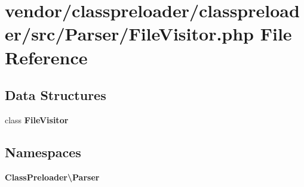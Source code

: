 \section{vendor/classpreloader/classpreloader/src/\+Parser/\+File\+Visitor.php File Reference}
\label{_file_visitor_8php}
\subsection*{Data Structures}
\begin{DoxyCompactItemize}
\item 
class {\bf File\+Visitor}
\end{DoxyCompactItemize}
\subsection*{Namespaces}
\begin{DoxyCompactItemize}
\item 
 {\bf Class\+Preloader\textbackslash{}\+Parser}
\end{DoxyCompactItemize}
